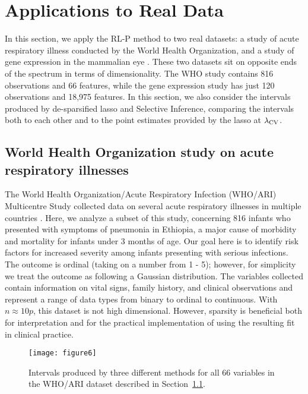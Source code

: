\section{Applications to Real Data}\label{Sec:RDA}

In this section, we apply the RL-P method to two real datasets: a study of acute respiratory illness conducted by the World Health Organization, and a study of gene expression in the mammalian eye \citep{Scheetz2006}. These two datasets sit on opposite ends of the spectrum in terms of dimensionality. The WHO study contains 816 observations and 66 features, while the gene expression study has just 120 observations and 18,975 features. In this section, we also consider the intervals produced by de-sparsified lasso and Selective Inference, comparing the intervals both to each other and to the point estimates provided by the lasso at $\lambda_{\textrm{CV}}$.

\subsection{World Health Organization study on acute respiratory illnesses}\label{Sec:WHO-ARI}

The World Health Organization/Acute Respiratory Infection (WHO/ARI) Multicentre Study collected data on several acute respiratory illnesses in multiple countries \citep{Harrell1998}. Here, we analyze a subset of this study, concerning 816 infants who presented with symptoms of pneumonia in Ethiopia, a major cause of morbidity and mortality for infants under 3 months of age. Our goal here is to identify risk factors for increased severity among infants presenting with serious infections. The outcome is ordinal (taking on a number from 1 - 5); however, for simplicity we treat the outcome as following a Gaussian distribution. The variables collected contain information on vital signs, family history, and clinical observations and represent a range of data types from binary to ordinal to continuous. With $n \approx 10p$, this dataset is not high dimensional. However, sparsity is beneficial both for interpretation and for the practical implementation of using the resulting fit in clinical practice.

\begin{figure}[htb!]
  \begin{center}
    \texttt{[image: figure6]}
    \caption{\label{fig:6} Intervals produced by three different methods for all 66 variables in the WHO/ARI dataset described in Section~\ref{Sec:WHO-ARI}.}
  \end{center}
\end{figure}

